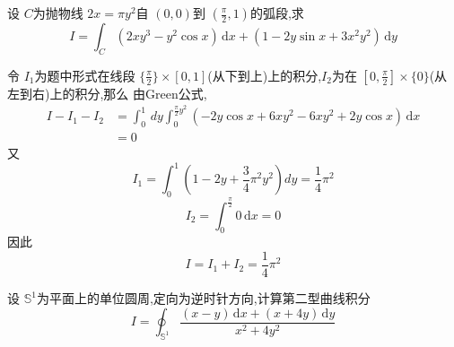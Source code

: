 \documentclass[lang=cn,12pt,color=green,fontset=none,thmcnt=section]{elegantbook}
\begin{document}
\begin{exercise}
     设 $C$为抛物线 $2x= \pi y^{2}$自 $\left( 0,0 \right)   $到 $\left( \frac{\pi}{2},1  \right) $的弧段,求 $$
     I= \int_{C} \left( 2xy^{3}-y^{2} \cos x     \right)\,\mathrm{d}x +  \left( 1-2y \sin x+  3x^{2}y^{2} \right) \,\mathrm{d}y  
     $$
\end{exercise}

\begin{solution}
    令 $I_1 $为题中形式在线段 $\{ \frac{\pi}{2}  \} \times \left[ 0,1 \right] $(从下到上)上的积分,$ I_{2}     $为在 $ \left[ 0,\frac{\pi}{2}\right] \times  \{ 0 \}  $(从左到右)上的积分,那么  由Green公式, $$
    \begin{aligned}
    I- I_1- I_2 &= \int_{0}^{1}\,dy\int_{0}^{ \frac{\pi}{2}y^{2}}\left( -2y\cos x+ 6xy^{2} -6xy^{2}+ 2y\cos x   \right) \,\mathrm{d}x
       \\ & = 0
    \end{aligned}
    $$又 $$
    I_1= \int_{0}^{1} \left( 1- 2y+ \frac{3}{4}\pi^{2} y^{2} \right)dy =  \frac{1}{4}\pi^{2} 
    $$ $$
    I_{2}= \int_{0}^{\frac{\pi}{2}} 0\,\mathrm{d}x = 0
    $$因此 $$
    I=I_1+ I_2=  \frac{1}{4}\pi^{2}
    $$
\end{solution}

\begin{exercise}
    设 $ \mathbb{S}^{1}  $为平面上的单位圆周,定向为逆时针方向,计算第二型曲线积分 $$
    I = \oint_{ \mathbb{S}^{1}}  \frac{\left( x-y        \right)\,\mathrm{d}x+ \left( x+ 4y  \right)\,\mathrm{d}y   }{ x^{2}+ 4y^{2}} 
    $$    
\end{exercise}
\end{document}
